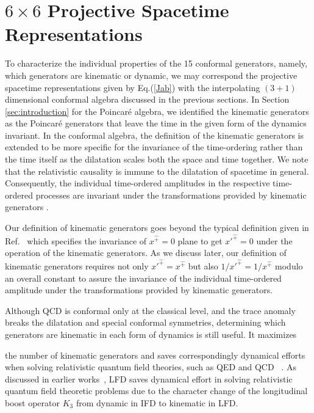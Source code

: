 \documentclass[foundations,article,submit,pdftex,moreauthors]{Definitions/mdpi}
\begin{document}
\section{\texorpdfstring{$6\times6$}{6x6} Projective Spacetime Representations}
\label{sec:projectivespace}
To characterize the individual properties of the 15 conformal generators, namely, which generators are kinematic or dynamic, we may correspond the projective spacetime representations 
given by Eq.(\ref{Jab}) with
the interpolating $(3+1)$ dimensional conformal algebra
discussed in the previous sections. 
{\color{blue}
In Section \ref{sec:introduction} for the Poincar\'e algebra,
we identified the kinematic generators as the Poincar\'e generators that leave the time in the given form of the dynamics invariant. 
In the conformal algebra, the definition of the kinematic generators is extended to be more specific for the invariance of the time-ordering 
rather than the time itself as the dilatation scales both the space and time together. We note that the relativistic causality is immune to the dilatation of spacetime in general.}  
Consequently, the individual time-ordered amplitudes in the respective time-ordered processes are invariant under the transformations provided by kinematic generators \cite{Ji2001, Ravikumar:2021xck}.
{\color{blue} 
Our definition of kinematic generators goes beyond the typical definition given in Ref.~\cite{LEUTWYLER197894} which specifies the invariance of $x^{\hat +} =0$ plane to get $x'^{\hat +} =0$ under the operation of the kinematic generators. 
As we discuss later, our definition of kinematic generators requires 
not only $x'^{\hat +} = x^{\hat +}$ but also $1/x'^{\hat +} = 1/x^{\hat +}$ modulo an overall constant to assure the invariance of the 
individual time-ordered amplitude
under the transformations provided by kinematic generators. 

Although 
QCD is conformal only at the classical level, and the trace anomaly breaks the dilatation and special conformal symmetries,  
determining which generators are kinematic in each form of dynamics is still useful. It  maximizes} the number of kinematic generators and  saves correspondingly dynamical efforts when solving relativistic quantum field theories, such as QED and QCD~ \cite{ji2023relativistic}. As discussed in earlier works~\cite{Ji-Hari-2026-PRD, Ji2001, Ji2025, Ji2015EM, Ji2021QCD,THOOFT1974461}, 
LFD saves dynamical effort in solving relativistic quantum field theoretic problems due to the character change of the longitudinal boost operator $K_3$ from dynamic in IFD to kinematic in LFD. 
\end{document}
